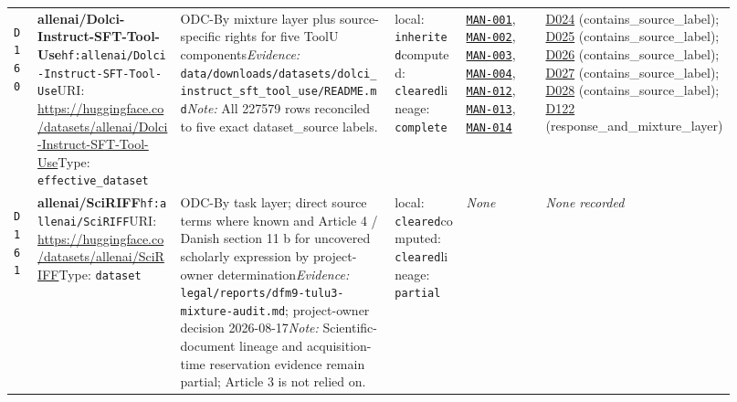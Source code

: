 \documentclass[9pt,a4paper]{article}
\newcommand{\depid}[1]{\hypertarget{dep:#1}{\texttt{#1}}}
\begin{document}
\begin{landscape}
\begin{longtable}{@{}L{0.035\linewidth}L{0.185\linewidth}L{0.27\linewidth}L{0.09\linewidth}L{0.10\linewidth}L{0.24\linewidth}@{}}
\depid{D160} & \textbf{allenai/Dolci-Instruct-SFT-Tool-Use}\newline \nolinkurl{hf:allenai/Dolci-Instruct-SFT-Tool-Use}\newline URI: \url{https://huggingface.co/datasets/allenai/Dolci-Instruct-SFT-Tool-Use}\newline Type: \texttt{effective\_dataset} & ODC-By mixture layer plus source-specific rights for five ToolU components\newline \textit{Evidence:} \nolinkurl{data/downloads/datasets/dolci_instruct_sft_tool_use/README.md}\newline \textit{Note:} All 227579 rows reconciled to five exact dataset\_source labels. & local: \texttt{inherited}\newline computed: \texttt{cleared}\newline lineage: \texttt{complete} & \hyperlink{manual:MAN-001}{\texttt{MAN-001}}, \hyperlink{manual:MAN-002}{\texttt{MAN-002}}, \hyperlink{manual:MAN-003}{\texttt{MAN-003}}, \hyperlink{manual:MAN-004}{\texttt{MAN-004}}, \hyperlink{manual:MAN-012}{\texttt{MAN-012}}, \hyperlink{manual:MAN-013}{\texttt{MAN-013}}, \hyperlink{manual:MAN-014}{\texttt{MAN-014}} & \hyperlink{dep:D024}{D024} (contains\_source\_label); \hyperlink{dep:D025}{D025} (contains\_source\_label); \hyperlink{dep:D026}{D026} (contains\_source\_label); \hyperlink{dep:D027}{D027} (contains\_source\_label); \hyperlink{dep:D028}{D028} (contains\_source\_label); \hyperlink{dep:D122}{D122} (response\_and\_mixture\_layer) \\
\depid{D161} & \textbf{allenai/SciRIFF}\newline \nolinkurl{hf:allenai/SciRIFF}\newline URI: \url{https://huggingface.co/datasets/allenai/SciRIFF}\newline Type: \texttt{dataset} & ODC-By task layer; direct source terms where known and Article 4 / Danish section 11 b for uncovered scholarly expression by project-owner determination\newline \textit{Evidence:} \nolinkurl{legal/reports/dfm9-tulu3-mixture-audit.md}; project-owner decision 2026-08-17\newline \textit{Note:} Scientific-document lineage and acquisition-time reservation evidence remain partial; Article 3 is not relied on. & local: \texttt{cleared}\newline computed: \texttt{cleared}\newline lineage: \texttt{partial} & \textit{None} & \textit{None recorded} \\

\end{longtable}
\end{landscape}
\end{document}
